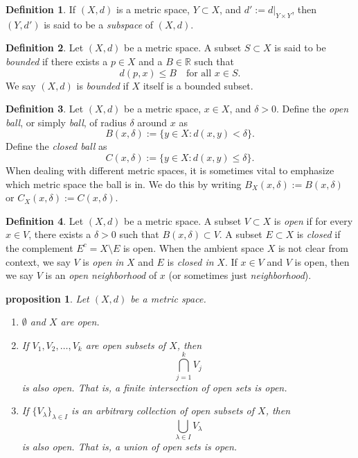 \documentclass{article}
\newtheorem{proposition}{Proposition}[section]
\newtheorem{proposition}{proposition}[section]
\theoremstyle{definition}
\newtheorem{definition}{Definition}[section]
\theoremstyle{remark}
\begin{document}
\begin{definition} \label{def:metric_subspace}
If \( (X, d) \) is a metric space, \( Y \subset X \), and \( d' := d|_{Y \times Y} \), then \( (Y, d') \) is said to be a \textit{subspace} of \( (X, d) \).
\end{definition}

\begin{definition} \label{def:bounded_subset}
Let \( (X, d) \) be a metric space. A subset \( S \subset X \) is said to be \textit{bounded} if there exists a \( p \in X \) and a \( B \in \mathbb{R} \) such that
\[
d(p, x) \leq B \quad \text{for all } x \in S.
\]
We say \( (X, d) \) is \textit{bounded} if \( X \) itself is a bounded subset.
\end{definition}

\begin{definition} \label{def:open_closed_ball}
Let \( (X, d) \) be a metric space, \( x \in X \), and \( \delta > 0 \). Define the \textit{open ball}, or simply \textit{ball}, of radius \( \delta \) around \( x \) as
\[
B(x, \delta) := \{ y \in X : d(x,y) < \delta \}.
\]
Define the \textit{closed ball} as
\[
C(x, \delta) := \{ y \in X : d(x,y) \leq \delta \}.
\]
When dealing with different metric spaces, it is sometimes vital to emphasize which metric space the ball is in. We do this by writing \( B_X(x, \delta) := B(x, \delta) \) or \( C_X(x, \delta) := C(x, \delta) \).
\end{definition}

\begin{definition} \label{def:open_closed_sets}
Let \( (X, d) \) be a metric space. A subset \( V \subset X \) is \textit{open} if for every \( x \in V \), there exists a \( \delta > 0 \) such that \( B(x, \delta) \subset V \). A subset \( E \subset X \) is \textit{closed} if the complement \( E^c = X \setminus E \) is open. When the ambient space \( X \) is not clear from context, we say \( V \) is \textit{open in} \( X \) and \( E \) is \textit{closed in} \( X \).
If \( x \in V \) and \( V \) is open, then we say \( V \) is an \textit{open neighborhood} of \( x \) (or sometimes just \textit{neighborhood}).
\end{definition}

\begin{proposition} \label{prop:open_sets}
Let \( (X, d) \) be a metric space.
\begin{enumerate}
\item \( \emptyset \) and \( X \) are open.
\item If \( V_1, V_2, \dots, V_k \) are open subsets of \( X \), then
\[
\bigcap_{j=1}^{k} V_j
\]
is also open. That is, a finite intersection of open sets is open.
\item If \( \{ V_{\lambda} \}_{\lambda \in I} \) is an arbitrary collection of open subsets of \( X \), then
\[
\bigcup_{\lambda \in I} V_{\lambda}
\]
is also open. That is, a union of open sets is open.
\end{enumerate}
\end{proposition}
\end{document}
